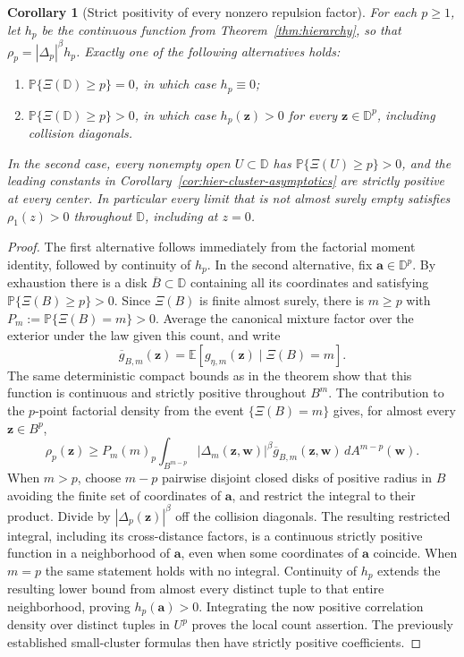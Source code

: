 \documentclass[11pt,a4paper]{article}
\numberwithin{equation}{section}
\newtheorem{corollary}[theorem]{Corollary}
\theoremstyle{definition}
\theoremstyle{remark}
\newcommand{\D}{\mathbb D}
\begin{document}
\begin{corollary}[Strict positivity of every nonzero repulsion factor]
\label{cor:strict-positive-repulsion-factor}
For each $p\ge1$, let $h_p$ be the continuous function from
Theorem~\ref{thm:hierarchy}, so that $\rho_p=|\Delta_p|^\beta h_p$.
Exactly one of the following alternatives holds:
\begin{enumerate}
\item $\mathbb P\{\Xi(\D)\ge p\}=0$, in which case $h_p\equiv0$;
\item $\mathbb P\{\Xi(\D)\ge p\}>0$, in which case
      $h_p(\mathbf z)>0$ for every $\mathbf z\in\D^p$, including
      collision diagonals.
\end{enumerate}
In the second case, every nonempty open $U\subset\D$ has
$\mathbb P\{\Xi(U)\ge p\}>0$, and the leading constants in
Corollary~\ref{cor:hier-cluster-asymptotics} are strictly positive at
every center. In particular every limit that is not almost surely
empty satisfies $\rho_1(z)>0$ throughout $\D$, including at $z=0$.
\end{corollary}

\begin{proof}
The first alternative follows immediately from the factorial moment
identity, followed by continuity of $h_p$. In the second alternative,
fix $\mathbf a\in\D^p$. By exhaustion there is a disk
$\overline B\subset\D$ containing all its coordinates and satisfying
$\mathbb P\{\Xi(B)\ge p\}>0$. Since $\Xi(B)$ is finite almost surely,
there is $m\ge p$ with $P_m:=\mathbb P\{\Xi(B)=m\}>0$.
Average the canonical mixture factor over the exterior under the law
given this count, and write
\[
 \overline g_{B,m}(\mathbf z)
       =\mathbb E[g_{\eta,m}(\mathbf z)\mid\Xi(B)=m].
\]
The same deterministic compact bounds as in the theorem show that
this function is continuous and strictly positive throughout $B^m$.
The contribution to the $p$-point factorial density from the event
$\{\Xi(B)=m\}$ gives, for almost every $\mathbf z\in B^p$,
\[
 \rho_p(\mathbf z)\ge
 P_m(m)_p\int_{B^{m-p}}|\Delta_m(\mathbf z,\mathbf w)|^\beta
          \overline g_{B,m}(\mathbf z,\mathbf w)\,dA^{m-p}(\mathbf w).
\]
When $m>p$, choose $m-p$ pairwise disjoint closed disks of positive
radius in $B$ avoiding the finite set of coordinates of $\mathbf a$,
and restrict the integral to their product. Divide by
$|\Delta_p(\mathbf z)|^\beta$ off the collision diagonals.
The resulting restricted integral, including its cross-distance
factors, is a continuous strictly positive function in a neighborhood
of $\mathbf a$, even when some coordinates of $\mathbf a$ coincide.
When $m=p$ the same statement holds with no integral. Continuity of
$h_p$ extends the resulting lower bound from almost every distinct
tuple to that entire neighborhood, proving $h_p(\mathbf a)>0$.
Integrating the now positive correlation density over distinct tuples
in $U^p$ proves the local count assertion. The previously established
small-cluster formulas then have strictly positive coefficients.
\end{proof}
\end{document}
